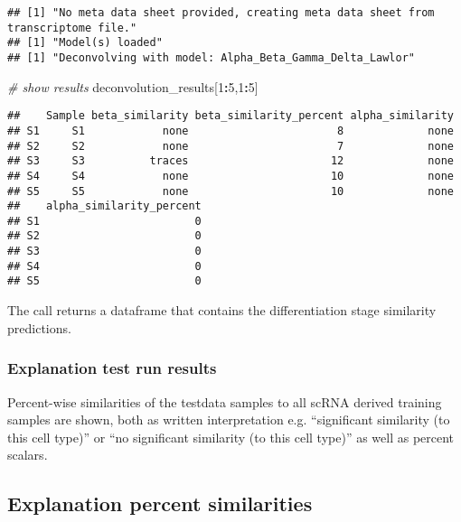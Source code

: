\documentclass[]{article}
\newenvironment{Shaded}{\begin{snugshade}}{\end{snugshade}}
\newcommand{\DecValTok}[1]{\textcolor[rgb]{0.00,0.00,0.81}{#1}}
\newcommand{\CommentTok}[1]{\textcolor[rgb]{0.56,0.35,0.01}{\textit{#1}}}
\newcommand{\OperatorTok}[1]{\textcolor[rgb]{0.81,0.36,0.00}{\textbf{#1}}}
\newcommand{\NormalTok}[1]{#1}
\begin{document}
\begin{verbatim}
## [1] "No meta data sheet provided, creating meta data sheet from transcriptome file."
## [1] "Model(s) loaded"
## [1] "Deconvolving with model: Alpha_Beta_Gamma_Delta_Lawlor"
\end{verbatim}

\begin{Shaded}
\begin{Highlighting}[]
\CommentTok{# show results}
\NormalTok{deconvolution_results[}\DecValTok{1}\OperatorTok{:}\DecValTok{5}\NormalTok{,}\DecValTok{1}\OperatorTok{:}\DecValTok{5}\NormalTok{]}
\end{Highlighting}
\end{Shaded}

\begin{verbatim}
##    Sample beta_similarity beta_similarity_percent alpha_similarity
## S1     S1            none                       8             none
## S2     S2            none                       7             none
## S3     S3          traces                      12             none
## S4     S4            none                      10             none
## S5     S5            none                      10             none
##    alpha_similarity_percent
## S1                        0
## S2                        0
## S3                        0
## S4                        0
## S5                        0
\end{verbatim}

The call returns a dataframe that contains the differentiation stage
similarity predictions.

\subsubsection{Explanation test run
results}\label{explanation-test-run-results}

Percent-wise similarities of the testdata samples to all scRNA derived
training samples are shown, both as written interpretation e.g.
``significant similarity (to this cell type)'' or ``no significant
similarity (to this cell type)'' as well as percent scalars.

\subsection{Explanation percent
similarities}\label{explanation-percent-similarities}
\end{document}
